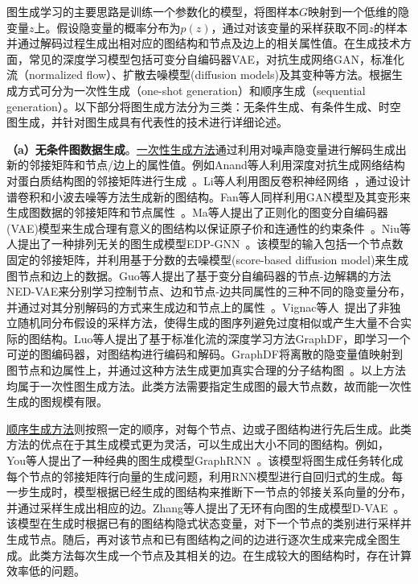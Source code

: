 \documentclass[12pt,UTF8,AutoFakeBold=2,a4paper]{ctexart} %
\begin{document}
图生成学习的主要思路是训练一个参数化的模型，将图样本$G$映射到一个低维的隐变量$z$上。假设隐变量的概率分布为$p(z)$，通过对该变量的采样获取不同$z$的样本并通过解码过程生成出相对应的图结构和节点及边上的相关属性值。在生成技术方面，常见的深度学习模型包括可变分自编码器VAE，对抗生成网络GAN，标准化流（normalized flow）、扩散去噪模型(diffusion models)及其变种等方法。根据生成方式可分为一次性生成（one-shot generation）和顺序生成（sequential generation）。以下部分将图生成方法分为三类：无条件生成、有条件生成、时空图生成，并针对图生成具有代表性的技术进行详细论述。

\textbf{（a）无条件图数据生成}。\underline{一次性生成方法}通过利用对噪声隐变量进行解码生成出新的邻接矩阵和节点/边上的属性值。例如Anand等人利用深度对抗生成网络结构对蛋白质结构图的邻接矩阵进行生成~\cite{anand2018generative}。Li等人利用图反卷积神经网络~\cite{li2021deconvolutional}，通过设计谱卷积和小波去噪等方法生成新的图结构。Fan等人同样利用GAN模型及其变形来生成图数据的邻接矩阵和节点属性~\cite{fan2019labeled}。Ma等人提出了正则化的图变分自编码器(VAE)模型来生成合理有意义的图结构以保证原子价和连通性的约束条件~\cite{ma2018constrained}。Niu等人提出了一种排列无关的图生成模型EDP-GNN~\cite{niu2020permutation}。该模型的输入包括一个节点数固定的邻接矩阵，并利用基于分数的去噪模型(score-based diffusion model)来生成图节点和边上的数据。Guo等人提出了基于变分自编码器的节点-边解耦的方法NED-VAE来分别学习控制节点、边和节点-边共同属性的三种不同的隐变量分布，并通过对其分别解码的方式来生成边和节点上的属性~\cite{guo2020interpretable}。Vignac等人~\cite{vignac2021top}提出了非独立随机同分布假设的采样方法，使得生成的图序列避免过度相似或产生大量不合实际的图结构。Luo等人提出了基于标准化流的深度学习方法GraphDF，即学习一个可逆的图编码器，对图结构进行编码和解码。GraphDF将离散的隐变量值映射到图节点和边属性上，并通过这种方法生成更加真实合理的分子结构图~\cite{luo2021graphdf}。以上方法均属于一次性图生成方法。此类方法需要指定生成图的最大节点数，故而能一次性生成的图规模有限。

\underline{顺序生成方法}则按照一定的顺序，对每个节点、边或子图结构进行先后生成。此类方法的优点在于其生成模式更为灵活，可以生成出大小不同的图结构。例如，%
You等人提出了一种经典的图生成模型GraphRNN~\cite{you2018graphrnn}。该模型将图生成任务转化成每个节点的邻接矩阵行向量的生成问题，利用RNN模型进行自回归式的生成。每一步生成时，模型根据已经生成的图结构来推断下一节点的邻接关系向量的分布，并通过采样生成出相应的边。Zhang等人提出了无环有向图的生成模型D-VAE~\cite{zhang2019d}。该模型在生成时根据已有的图结构隐式状态变量，对下一个节点的类别进行采样并生成节点。随后，再对该节点和已有图结构之间的边进行逐次生成来完成全图生成。此类方法每次生成一个节点及其相关的边。在生成较大的图结构时，存在计算效率低的问题。
\end{document}

